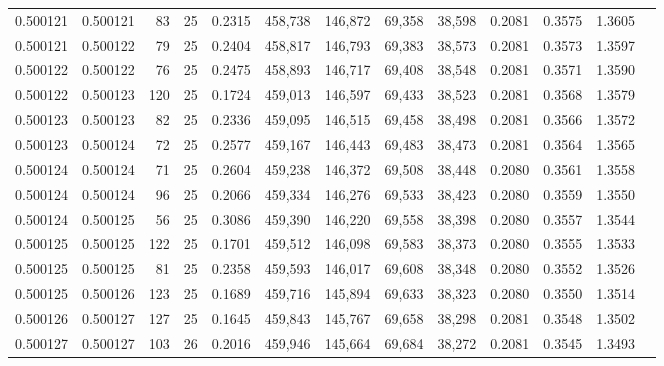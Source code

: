\begin{tabular}{rrrrrrrrrrrrr}
0.500121 & 0.500121 &  83 &  25 &                                     0.2315 & 458,738 & 146,872 &  69,358 &  38,598 & 0.2081 & 0.3575 & 1.3605 \\
0.500121 & 0.500122 &  79 &  25 &                                     0.2404 & 458,817 & 146,793 &  69,383 &  38,573 & 0.2081 & 0.3573 & 1.3597 \\
0.500122 & 0.500122 &  76 &  25 &                                     0.2475 & 458,893 & 146,717 &  69,408 &  38,548 & 0.2081 & 0.3571 & 1.3590 \\
0.500122 & 0.500123 & 120 &  25 &                                     0.1724 & 459,013 & 146,597 &  69,433 &  38,523 & 0.2081 & 0.3568 & 1.3579 \\
0.500123 & 0.500123 &  82 &  25 &                                     0.2336 & 459,095 & 146,515 &  69,458 &  38,498 & 0.2081 & 0.3566 & 1.3572 \\
0.500123 & 0.500124 &  72 &  25 &                                     0.2577 & 459,167 & 146,443 &  69,483 &  38,473 & 0.2081 & 0.3564 & 1.3565 \\
0.500124 & 0.500124 &  71 &  25 &                                     0.2604 & 459,238 & 146,372 &  69,508 &  38,448 & 0.2080 & 0.3561 & 1.3558 \\
0.500124 & 0.500124 &  96 &  25 &                                     0.2066 & 459,334 & 146,276 &  69,533 &  38,423 & 0.2080 & 0.3559 & 1.3550 \\
0.500124 & 0.500125 &  56 &  25 &                                     0.3086 & 459,390 & 146,220 &  69,558 &  38,398 & 0.2080 & 0.3557 & 1.3544 \\
0.500125 & 0.500125 & 122 &  25 &                                     0.1701 & 459,512 & 146,098 &  69,583 &  38,373 & 0.2080 & 0.3555 & 1.3533 \\
0.500125 & 0.500125 &  81 &  25 &                                     0.2358 & 459,593 & 146,017 &  69,608 &  38,348 & 0.2080 & 0.3552 & 1.3526 \\
0.500125 & 0.500126 & 123 &  25 &                                     0.1689 & 459,716 & 145,894 &  69,633 &  38,323 & 0.2080 & 0.3550 & 1.3514 \\
0.500126 & 0.500127 & 127 &  25 &                                     0.1645 & 459,843 & 145,767 &  69,658 &  38,298 & 0.2081 & 0.3548 & 1.3502 \\
0.500127 & 0.500127 & 103 &  26 &                                     0.2016 & 459,946 & 145,664 &  69,684 &  38,272 & 0.2081 & 0.3545 & 1.3493 \\

\end{tabular}
